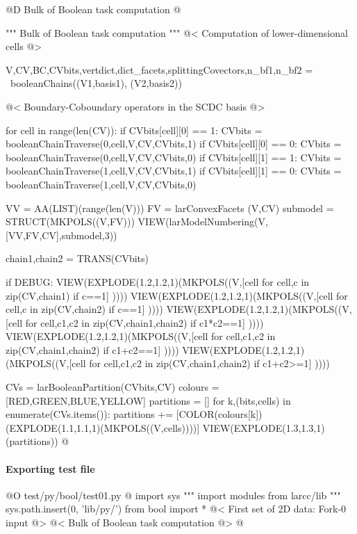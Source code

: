 \documentclass[11pt,oneside]{article}	%
\begin{document}
@D Bulk of Boolean task computation
@{""" Bulk of Boolean task computation """
@< Computation of lower-dimensional cells @>

V,CV,BC,CVbits,vertdict,dict_facets,splittingCovectors,n_bf1,n_bf2 = \
	booleanChains((V1,basis1), (V2,basis2))
	
@< Boundary-Coboundary operators in the SCDC basis @>

for cell in range(len(CV)):
	if CVbits[cell][0] == 1:
		CVbits = booleanChainTraverse(0,cell,V,CV,CVbits,1)		
	if CVbits[cell][0] == 0:
		CVbits = booleanChainTraverse(0,cell,V,CV,CVbits,0)
	if CVbits[cell][1] == 1:
		CVbits = booleanChainTraverse(1,cell,V,CV,CVbits,1)
	if CVbits[cell][1] == 0:
		CVbits = booleanChainTraverse(1,cell,V,CV,CVbits,0)

VV = AA(LIST)(range(len(V)))
FV = larConvexFacets (V,CV)
submodel = STRUCT(MKPOLS((V,FV)))
VIEW(larModelNumbering(V,[VV,FV,CV],submodel,3))

chain1,chain2 = TRANS(CVbits)

if DEBUG:
	VIEW(EXPLODE(1.2,1.2,1)(MKPOLS((V,[cell for cell,c in zip(CV,chain1) if c==1] ))))
	VIEW(EXPLODE(1.2,1.2,1)(MKPOLS((V,[cell for cell,c in zip(CV,chain2) if c==1] ))))
	VIEW(EXPLODE(1.2,1.2,1)(MKPOLS((V,[cell for cell,c1,c2 in zip(CV,chain1,chain2) if c1*c2==1] ))))
	VIEW(EXPLODE(1.2,1.2,1)(MKPOLS((V,[cell for cell,c1,c2 in zip(CV,chain1,chain2) if c1+c2==1] ))))
	VIEW(EXPLODE(1.2,1.2,1)(MKPOLS((V,[cell for cell,c1,c2 in zip(CV,chain1,chain2) if c1+c2>=1] ))))
	
CVs = larBooleanPartition(CVbits,CV)
colours = [RED,GREEN,BLUE,YELLOW]
partitions = []
for k,(bits,cells) in enumerate(CVs.items()):
	partitions += [COLOR(colours[k])(EXPLODE(1.1,1.1,1)(MKPOLS((V,cells))))]
VIEW(EXPLODE(1.3,1.3,1)(partitions))
@}

\paragraph{Exporting test file}

@O test/py/bool/test01.py
@{
import sys
""" import modules from larcc/lib """
sys.path.insert(0, 'lib/py/')
from bool import *
@< First set of 2D data: Fork-0 input @>
@< Bulk of Boolean task computation @>
@}
\end{document}
